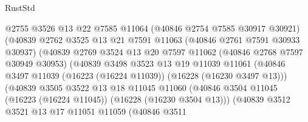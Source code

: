 \begin{lexlean}{RustStd}
\begin{coremodule}
                                @2755
                                @3526
                                @13
                                @22
                                @7585
                                @11064
                                (@40846 @2754 @7585 @30917 @30921)
                                (@40839
                                  @2762
                                  @3525
                                  @13
                                  @21
                                  @7591
                                  @11063
                                  (@40846 @2761 @7591 @30933 @30937)
                                  (@40839
                                    @2769
                                    @3524
                                    @13
                                    @20
                                    @7597
                                    @11062
                                    (@40846 @2768 @7597 @30949 @30953)
                                    (@40839
                                      @3498
                                      @3523
                                      @13
                                      @19
                                      @11039
                                      @11061
                                      (@40846
                                        @3497
                                        @11039
                                        (@16223 (@16224 @11039))
                                        (@16228 (@16230 @3497 @13)))
                                      (@40839
                                        @3505
                                        @3522
                                        @13
                                        @18
                                        @11045
                                        @11060
                                        (@40846
                                          @3504
                                          @11045
                                          (@16223 (@16224 @11045))
                                          (@16228 (@16230 @3504 @13)))
                                        (@40839
                                          @3512
                                          @3521
                                          @13
                                          @17
                                          @11051
                                          @11059
                                          (@40846
                                            @3511

\end{coremodule}
\end{lexlean}
